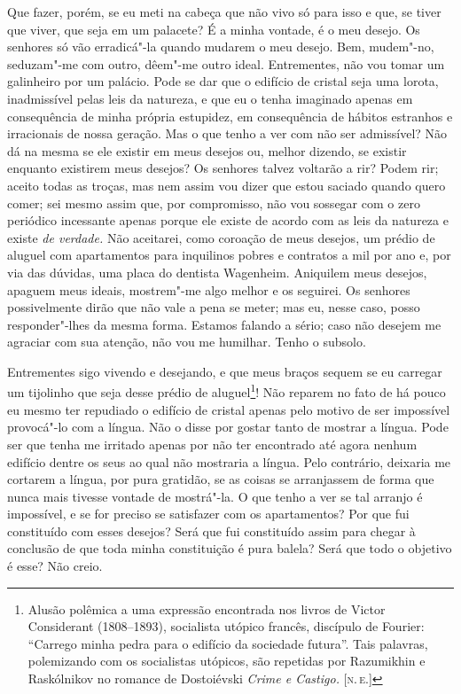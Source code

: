 Que fazer, porém, se eu meti na cabeça que não vivo só para isso e que,
se tiver que viver, que seja em um palacete? É a minha vontade, é o meu
desejo. Os senhores só vão erradicá"-la quando mudarem o meu desejo. Bem,
mudem"-no, seduzam"-me com outro, dêem"-me outro ideal. Entrementes, não
vou tomar um galinheiro por um palácio. Pode se dar que o edifício de
cristal seja uma lorota, inadmissível pelas leis da natureza, e que eu o
tenha imaginado apenas em consequência de minha própria estupidez, em
consequência de hábitos estranhos e irracionais de nossa geração. Mas o
que tenho a ver com não ser admissível? Não dá na mesma se ele existir
em meus desejos ou, melhor dizendo, se existir enquanto existirem meus
desejos? Os senhores talvez voltarão a rir? Podem rir; aceito todas as
troças, mas nem assim vou dizer que estou saciado quando quero comer;
sei mesmo assim que, por compromisso, não vou sossegar com o zero
periódico incessante apenas porque ele existe de acordo com as leis da
natureza e existe \emph{de verdade.} Não aceitarei, como coroação de
meus desejos, um prédio de aluguel com apartamentos para inquilinos
pobres e contratos a mil por ano e, por via das dúvidas, uma placa do
dentista Wagenheim. Aniquilem meus desejos, apaguem meus ideais,
mostrem"-me algo melhor e os seguirei. Os senhores possivelmente dirão
que não vale a pena se meter; mas eu, nesse caso, posso responder"-lhes
da mesma forma. Estamos falando a sério; caso não desejem me agraciar
com sua atenção, não vou me humilhar. Tenho o subsolo.

Entrementes sigo vivendo e desejando, e que meus braços sequem se eu
carregar um tijolinho que seja desse prédio de aluguel\footnote{Alusão
  polêmica a uma expressão encontrada nos livros de Victor Considerant
  (1808--1893), socialista utópico francês, discípulo de Fourier:
  ``Carrego minha pedra para o edifício da sociedade futura''. Tais
  palavras, polemizando com os socialistas utópicos, são repetidas por
  Razumikhin e Raskólnikov no romance de Dostoiévski \emph{Crime e
  Castigo.} {[}\textsc{n.\,e.}{]}}! Não reparem no fato de há pouco eu mesmo ter
repudiado o edifício de cristal apenas pelo motivo de ser impossível
provocá"-lo com a língua. Não o disse por gostar tanto de mostrar a
língua. Pode ser que tenha me irritado apenas por não ter encontrado até
agora nenhum edifício dentre os seus ao qual não mostraria a língua.
Pelo contrário, deixaria me cortarem a língua, por pura gratidão, se as
coisas se arranjassem de forma que nunca mais tivesse vontade de
mostrá"-la. O que tenho a ver se tal arranjo é impossível, e se for
preciso se satisfazer com os apartamentos? Por que fui constituído com
esses desejos? Será que fui constituído assim para chegar à conclusão de
que toda minha constituição é pura balela? Será que todo o objetivo é
esse? Não creio.

